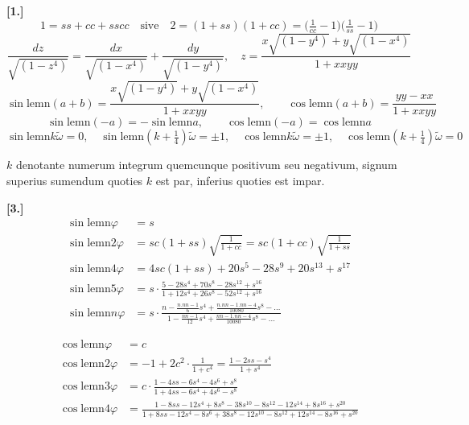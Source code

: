 \documentclass[10pt,a4paper]{article}
\newcommand{\lemn}{\text{lemn}}
\newcommand{\sinlemn}{\sin\lemn}
\newcommand{\coslemn}{\cos\lemn}
\begin{document}
\medskip
\noindent\textbf{[1.]}
\[
1 = ss+cc+sscc \quad\text{sive}\quad 2 = (1+ss)(1+cc) = \bigl(\tfrac{1}{cc}-1\bigr)\bigl(\tfrac{1}{ss}-1\bigr)
\]
\[
\frac{dz}{\sqrt{(1-z^4)}} = \frac{dx}{\sqrt{(1-x^4)}} + \frac{dy}{\sqrt{(1-y^4)}}, \quad
z = \frac{x\sqrt{(1-y^4)}+y\sqrt{(1-x^4)}}{1+xxyy}
\]
\[
\sinlemn(a+b) = \frac{x\sqrt{(1-y^4)}+y\sqrt{(1-x^4)}}{1+xxyy}, \qquad
\coslemn(a+b) = \frac{yy-xx}{1+xxyy}
\]
\[
\sinlemn(-a) = -\sinlemn a, \qquad \coslemn(-a) = \coslemn a
\]
\[
\sinlemn k\tilde{\omega} = 0, \quad \sinlemn(k+\tfrac14)\tilde{\omega} = \pm 1, \quad
\coslemn k\tilde{\omega} = \pm 1, \quad \coslemn(k+\tfrac14)\tilde{\omega} = 0
\]

$k$ denotante numerum integrum quemcunque positivum seu negativum, signum
superius sumendum quoties $k$ est par, inferius quoties est impar.

\medskip
\noindent\textbf{[3.]}
\begin{align*}
\sinlemn\varphi &= s\\
\sinlemn 2\varphi &= sc(1+ss)\sqrt{\frac{1}{1+cc}} = sc(1+cc)\sqrt{\frac{1}{1+ss}}\\
\sinlemn 4\varphi &= 4sc(1+ss) + 20s^5 - 28s^9 + 20s^{13} + s^{17}\\
\sinlemn 5\varphi &= s\cdot\frac{5-28s^4+70s^8-28s^{12}+s^{16}}{1+12s^4+26s^8-52s^{12}+s^{16}}\\
\sinlemn n\varphi &= s\cdot\frac{n-\frac{n.nn-1}{6}s^4+\frac{n.nn-1.nn-4}{10080}s^8-\ldots}{1-\frac{nn-1}{12}s^4+\frac{nn-1.nn-4}{10080}s^8-\ldots}
\end{align*}

\begin{align*}
\coslemn\varphi &= c\\
\coslemn 2\varphi &= -1+2c^2\cdot\frac{1}{1+c^4} = \frac{1-2ss-s^4}{1+s^4}\\
\coslemn 3\varphi &= c\cdot\frac{1-4ss-6s^4-4s^6+s^8}{1+4ss-6s^4+4s^6-s^8}\\
\coslemn 4\varphi &= \frac{1-8ss-12s^4+8s^8-38s^{10}-8s^{12}-12s^{14}+8s^{16}+s^{20}}{1+8ss-12s^4-8s^6+38s^8-12s^{10}-8s^{12}+12s^{14}-8s^{16}+s^{20}}
\end{align*}
\end{document}
